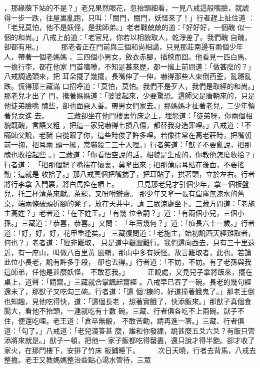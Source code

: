 \begin{pinyinscope}
{，那綠蔭下站的不是？」老兒果然眼花，忽抬頭細看，一見八戒這般嘴臉，就諕
得一步一跌，往屋裏亂跑，只叫：「關門，關門，妖怪來了！」行者趕上扯住道
：「老兒莫怕，他不是妖怪，是我師弟。」老者戰兢兢的道：「好好好，一個醜
似一個的和尚。」八戒上前道：「老官兒，你若以相貌取人，乾淨差了。我們醜
自醜，卻都有用。」
　　
那老者正在門前與三個和尚相講，只見那莊南邊有兩個少年人，帶著一個老媽媽
、三四個小男女，斂衣赤腳，插秧而回。他看見一匹白馬、一擔行李，都在他家
門首喧嘩，不知是甚來歷，都一擁上前問道：「做甚麼的？」八戒調過頭來，把
耳朵擺了幾擺，長嘴伸了一伸，嚇得那些人東倒西歪，亂蹡亂跌。慌得那三藏滿
口招呼道：「莫怕，莫怕。我們不是歹人，我們是取經的和尚。」那老兒才出了
門，攙著媽媽道：「婆婆起來，少要驚恐。這師父是唐朝來的，只是他徒弟臉嘴
醜些，卻也面惡人善。帶男女們家去。」那媽媽才扯著老兒，二少年領著兒女進
去。
　　
三藏卻坐在他門樓裏竹床之上，埋怨道：「徒弟呀，你兩個相貌既醜，言語又粗
，把這一家兒嚇得七損八傷，都替我身造罪哩。」八戒道：「不瞞師父說，老豬
自從跟了你，這些時俊了許多哩。若像往常在高老莊時，把嘴朝前一掬，把耳兩
頭一擺，常嚇殺二三十人哩。」行者笑道：「獃子不要亂說，把那醜也收拾起些
。」三藏道：「你看悟空說的話，相貌是生成的，你教他怎麼收拾？」行者道：
「把那個耙子嘴揣在懷裏，莫拿出來﹔把那蒲扇耳貼在後面，不要搖動：這就是
收拾了。」那八戒真個把嘴揣了，把耳貼了，拱著頭，立於左右。行者將行李拿
入門裏，將白馬拴在樁上。
　　
只見那老兒才引個少年，拿一個板盤兒，托三杯清茶來獻。茶罷，又吩咐辦齋。
那少年又拿一張有窟窿無漆水的舊桌，端兩條破頭折腳的凳子，放在天井中，請
三眾涼處坐下。三藏方問道：「老施主高姓？」老者道：「在下姓王。」「有幾
位令嗣？」道：「有兩個小兒，三個小孫。」三藏道：「恭喜，恭喜。」又問：
「年壽幾何？」道：「痴長六十一歲。」行者道：「好，好，好，花甲重逢矣。」
三藏復問道：「老施主，始初說西天經難取者，何也？」老者道：「經非難取，
只是道中艱澀難行。我們這向西去，只有三十里遠近，有一座山，叫做八百里黃
風嶺，那山中多有妖怪。故言難取者，此也。若論此位小長老，說有許多手段，
卻也去得。」行者道：「不妨，不妨。有了老孫與我這師弟，任他是甚麼妖怪，
不敢惹我。」
　　
正說處，又見兒子拿將飯來，擺在桌上，道聲：「請齋。」三藏就合掌諷起齋經
。八戒早已吞了一碗。長老的幾句經還未了，那獃子又吃勾三碗。行者道：「這
個?糠的，好道撞著餓鬼了。」那老王倒也知趣，見他吃得快，道：「這個長老
，想著實餓了，快添飯來。」那獃子真個食腸大，看他不抬頭，一連就吃有十數
碗。三藏、行者俱各吃不上兩碗。獃子不住，便還吃哩。老王道：「倉卒無殽，
不敢苦勸，請再進一箸。」三藏、行者俱道：「勾了。」八戒道：「老兒滴答甚
麼，誰和你發課，說甚麼五爻六爻？有飯只管添將來就是。」獃子一頓，把他一
家子飯都吃得罄盡，還只說才得半飽。卻才收了家火，在那門樓下，安排了竹床
板鋪睡下。
　　
次日天曉，行者去背馬，八戒去整擔。老王又教媽媽整治些點心湯水管待，三眾
}
\end{pinyinscope}
